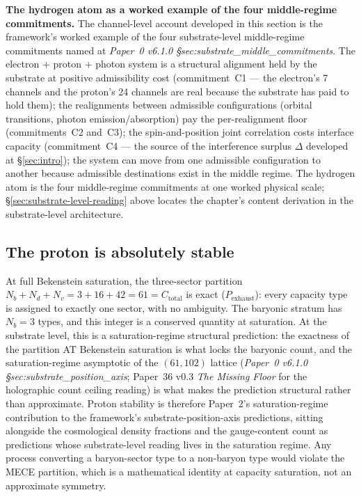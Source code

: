 \documentclass[11pt]{article}
\begin{document}
\smallskip\noindent\textbf{The hydrogen atom as a worked example of the four middle-regime commitments.} The channel-level account developed in this section is the framework's worked example of the four substrate-level middle-regime commitments named at \emph{Paper~0 v6.1.0 \S sec:substrate\_middle\_commitments}. The electron + proton + photon system is a structural alignment held by the substrate at positive admissibility cost (commitment~C1 --- the electron's 7 channels and the proton's 24 channels are real because the substrate has paid to hold them); the realignments between admissible configurations (orbital transitions, photon emission/absorption) pay the per-realignment floor (commitments~C2 and~C3); the spin-and-position joint correlation costs interface capacity (commitment~C4 --- the source of the interference surplus $\Delta$ developed at \S\ref{sec:intro}); the system can move from one admissible configuration to another because admissible destinations exist in the middle regime. The hydrogen atom is the four middle-regime commitments at one worked physical scale; \S\ref{sec:substrate-level-reading} above locates the chapter's content derivation in the substrate-level architecture.

\subsection{The proton is absolutely stable}
\label{sec:proton_stability}

At full Bekenstein saturation, the three-sector partition $N_b + N_d + N_v = 3 + 16 + 42 = 61 = C_{\mathrm{total}}$ is exact ($P_{\mathrm{exhaust}}$): every capacity type is assigned to exactly one sector, with no ambiguity.  The baryonic stratum has $N_b = 3$ types, and this integer is a conserved quantity at saturation.  At the substrate level, this is a saturation-regime structural prediction: the exactness of the partition AT Bekenstein saturation is what locks the baryonic count, and the saturation-regime asymptotic of the $(61, 102)$ lattice (\emph{Paper~0 v6.1.0 \S sec:substrate\_position\_axis}; Paper~36 v0.3 \emph{The Missing Floor} for the holographic count ceiling reading) is what makes the prediction structural rather than approximate. Proton stability is therefore Paper~2's saturation-regime contribution to the framework's substrate-position-axis predictions, sitting alongside the cosmological density fractions and the gauge-content count as predictions whose substrate-level reading lives in the saturation regime.  Any process converting a baryon-sector type to a non-baryon type would violate the MECE partition, which is a mathematical identity at capacity saturation, not an approximate symmetry.
\end{document}
